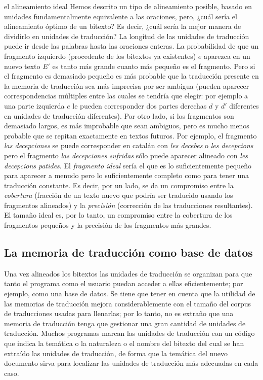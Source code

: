 \begin{persabermes}{el alineamiento ideal} Hemos descrito un tipo de alineamiento posible, basado en unidades fundamentalmente equivalente a las oraciones, pero, ¿cuál sería el alineamiento óptimo de un bitexto? Es decir, ¿cuál sería la mejor manera de dividirlo en unidades de traducción? La longitud de las unidades de traducción puede ir desde las palabras hasta las oraciones enteras. La probabilidad de que un fragmento izquierdo (procedente de los bitextos ya existentes) $e$ aparezca en un nuevo texto $E'$ es tanto más grande cuanto más pequeño es el fragmento. Pero si el fragmento es demasiado pequeño es más probable que la traducción presente en la memoria de traducción sea más imprecisa por ser ambigua (pueden aparecer correspondencias múltiples entre las cuales se tendría que elegir: por ejemplo a una parte izquierda $e$ le pueden corresponder dos partes derechas $d$ y $d'$ diferentes en unidades de traducción diferentes). Por otro lado, si los fragmentos son demasiado largos, es más improbable que sean ambiguos, pero es mucho menos probable que se repitan exactamente en textos futuros. Por ejemplo, el fragmento \emph{las decepciones} se puede corresponder en catalán con \emph{les decebes} o \emph{les decepcions} pero el fragmento \emph{las decepciones sufridas} sólo puede aparecer alineado con \emph{les decepcions patides}. El \emph{fragmento ideal} sería el que es lo suficientemente pequeño para aparecer a menudo pero lo suficientemente completo como para tener una traducción constante. Es decir, por un lado, se da un compromiso entre la \emph{cobertura} (fracción de un texto nuevo que podría ser traducido usando los fragmentos alineados) y la \emph{precisión} (corrección de las traducciones resultantes). El tamaño ideal es, por lo tanto, un compromiso entre la cobertura de los fragmentos pequeños y la precisión de los fragmentos más grandes. \end{persabermes} 

\subsection{La memoria de traducción como base de datos} 

Una vez alineados los bitextos las unidades de traducción se organizan para que tanto el programa como el usuario puedan acceder a ellas eficientemente; por ejemplo, como una base de datos. Se tiene que tener en cuenta que la utilidad de las memorias de traducción mejora considerablemente con el tamaño del corpus de traducciones usadas para llenarlas; por lo tanto, no es extraño que una memoria de traducción tenga que gestionar una gran cantidad de unidades de traducción. Muchos programas marcan las unidades de traducción con un código que indica la temática o la naturaleza o el nombre del bitexto del cual se han extraído las unidades de traducción, de forma que la temática del nuevo documento sirva para localizar las unidades de traducción más adecuadas en cada caso. 

